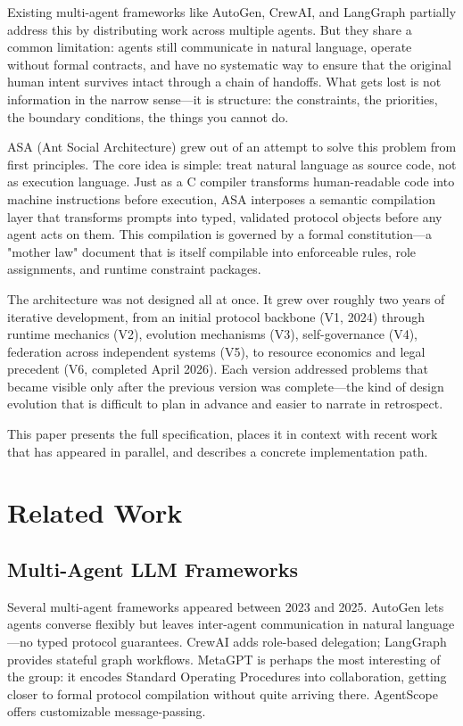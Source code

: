 \documentclass[12pt,a4paper]{article}
\begin{document}
Existing multi-agent frameworks like AutoGen, CrewAI, and LangGraph partially address this by distributing work across multiple agents. But they share a common limitation: agents still communicate in natural language, operate without formal contracts, and have no systematic way to ensure that the original human intent survives intact through a chain of handoffs. What gets lost is not information in the narrow sense---it is structure: the constraints, the priorities, the boundary conditions, the things you cannot do.

ASA (Ant Social Architecture) grew out of an attempt to solve this problem from first principles. The core idea is simple: treat natural language as source code, not as execution language. Just as a C compiler transforms human-readable code into machine instructions before execution, ASA interposes a semantic compilation layer that transforms prompts into typed, validated protocol objects before any agent acts on them. This compilation is governed by a formal constitution---a "mother law" document that is itself compilable into enforceable rules, role assignments, and runtime constraint packages.

The architecture was not designed all at once. It grew over roughly two years of iterative development, from an initial protocol backbone (V1, 2024) through runtime mechanics (V2), evolution mechanisms (V3), self-governance (V4), federation across independent systems (V5), to resource economics and legal precedent (V6, completed April 2026). Each version addressed problems that became visible only after the previous version was complete---the kind of design evolution that is difficult to plan in advance and easier to narrate in retrospect.

This paper presents the full specification, places it in context with recent work that has appeared in parallel, and describes a concrete implementation path.

\section{Related Work}


\subsection{Multi-Agent LLM Frameworks}


Several multi-agent frameworks appeared between 2023 and 2025. AutoGen \cite{ref13} lets agents converse flexibly but leaves inter-agent communication in natural language---no typed protocol guarantees. CrewAI \cite{ref10} adds role-based delegation; LangGraph \cite{ref13} provides stateful graph workflows. MetaGPT \cite{ref5} is perhaps the most interesting of the group: it encodes Standard Operating Procedures into collaboration, getting closer to formal protocol compilation without quite arriving there. AgentScope \cite{ref3} offers customizable message-passing.
\end{document}

